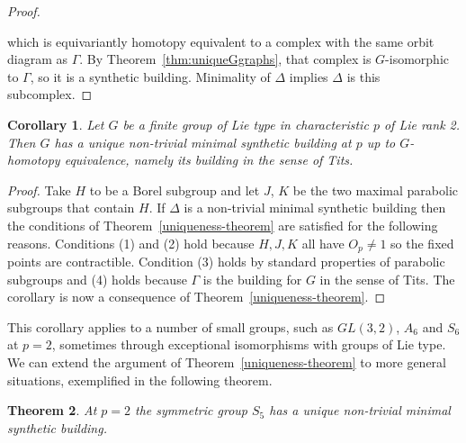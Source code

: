 \documentclass[12pt]{amsart}
\theoremstyle{plain}
\newtheorem{theorem}{Theorem}[section]
\newtheorem{corollary}[theorem]{Corollary}
\theoremstyle{definition}
\theoremstyle{remark}
\numberwithin{equation}{section}
\begin{document}
\begin{proof}
\begin{center}
\end{center}
which is equivariantly homotopy equivalent to a complex with the same orbit diagram as $\Gamma$. By Theorem~\ref{thm:uniqueGgraphs}, that complex is $G$-isomorphic to $\Gamma$, so it is a synthetic building. Minimality of $\Delta$ implies $\Delta$ is this subcomplex.
\end{proof}

\begin{corollary}
\label{Lie-rank-2-uniqueness}
    Let $G$ be a finite group of Lie type in characteristic $p$ of Lie rank 2. Then $G$ has a unique non-trivial minimal synthetic building at $p$ up to $G$-homotopy equivalence, namely its building in the sense of Tits.
\end{corollary}

\begin{proof}
    Take $H$ to be a Borel subgroup and let $J$, $K$ be the two maximal parabolic subgroups that contain $H$. If $\Delta$ is a non-trivial minimal synthetic building then the conditions of Theorem~\ref{uniqueness-theorem} are satisfied for the following reasons. Conditions (1) and (2) hold because $H,J,K$ all have $O_p\ne 1$ so the fixed points are contractible. Condition (3) holds by standard properties of parabolic subgroups and (4) holds because $\Gamma$ is the building for $G$ in the sense of Tits. The corollary is now a consequence of Theorem~\ref{uniqueness-theorem}.
\end{proof}

This corollary applies to a number of small groups, such as $GL(3,2)$, $A_6$ and $S_6$ at $p=2$, sometimes through exceptional isomorphisms with groups of Lie type. We can extend the argument of Theorem~\ref{uniqueness-theorem} to more general situations, exemplified in the following theorem.

\begin{theorem}
    At $p=2$ the symmetric group $S_5$ has a unique non-trivial minimal synthetic building.
\end{theorem}
\end{document}
